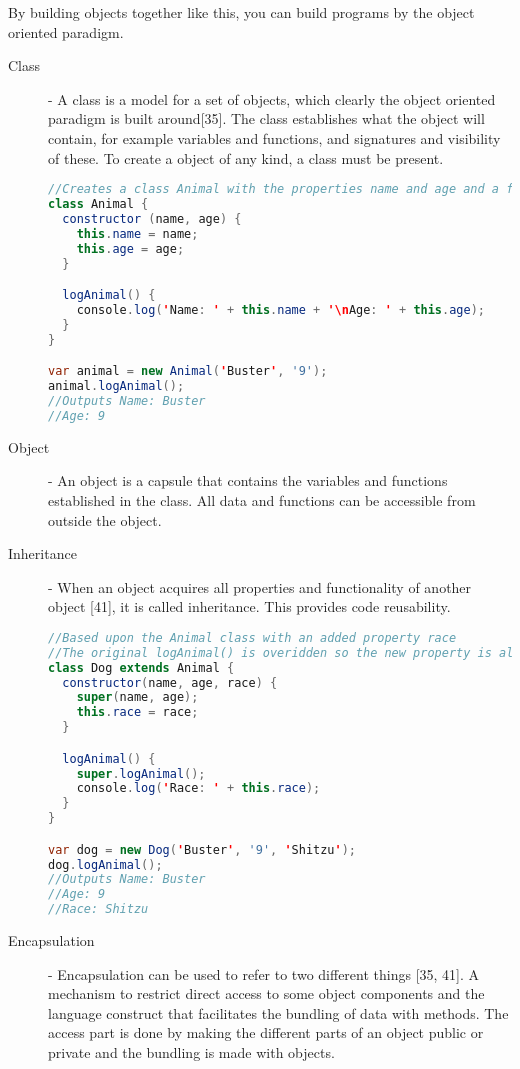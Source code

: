 \documentclass {article}
\begin{document}
By building objects together like this, you can build programs by the object oriented paradigm.  

\begin{description}
\item [Class] - A class is a model for a set of objects, which clearly the object oriented paradigm is built around[35]. The class establishes what the object will contain, for example variables and functions, and signatures and visibility of these. To create a object of any kind, a class must be present. 

\begin{lstlisting}[language=Java]
//Creates a class Animal with the properties name and age and a function for logging the properties to the screen
class Animal {
  constructor (name, age) {
    this.name = name;
    this.age = age;
  }

  logAnimal() {
    console.log('Name: ' + this.name + '\nAge: ' + this.age);
  }
}

var animal = new Animal('Buster', '9');
animal.logAnimal();
//Outputs Name: Buster
//Age: 9
\end{lstlisting}

\item [Object] - An object is a capsule that contains the variables and functions established in the class. All data and functions can be accessible from outside the object.

\item [Inheritance] - When an object acquires all properties and functionality of another object [41], it is called inheritance. This provides code reusability. 

\begin{lstlisting}[language=Java, breaklines=true]
//Based upon the Animal class with an added property race
//The original logAnimal() is overidden so the new property is also logged to the screen.
class Dog extends Animal {
  constructor(name, age, race) {
    super(name, age);
    this.race = race;
  }

  logAnimal() {
    super.logAnimal();
    console.log('Race: ' + this.race);
  }
}

var dog = new Dog('Buster', '9', 'Shitzu');
dog.logAnimal();
//Outputs Name: Buster
//Age: 9
//Race: Shitzu
\end{lstlisting}

\item [Encapsulation] - Encapsulation can be used to refer to two different things [35, 41]. A mechanism to restrict direct access to some object components and the language construct that facilitates the bundling of data with methods. The access part is done by making the different parts of an object public or private and the bundling is made with objects.
\end{description}
\end{document}
